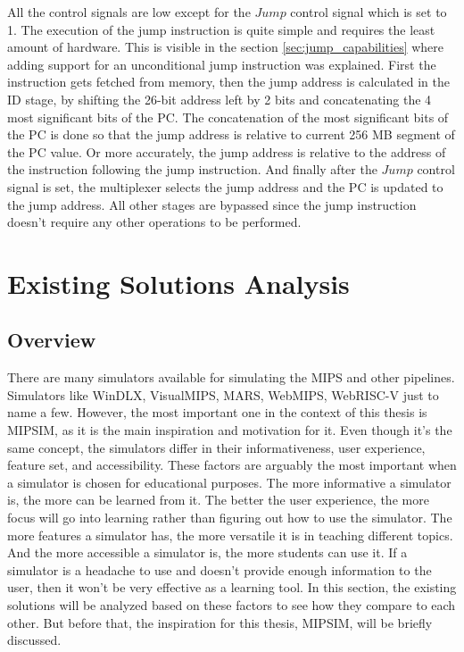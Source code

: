 All the control signals are low except for the $Jump$ control signal which is set to 1. The execution of the jump instruction is quite simple and requires the least amount of hardware. This is visible in the section \ref{sec:jump_capabilities} where adding support for an unconditional jump instruction was explained. First the instruction gets fetched from memory, then the jump address is calculated in the ID stage, by shifting the 26-bit address left by 2 bits and concatenating the 4 most significant bits of the PC. The concatenation of the most significant bits of the PC is done so that the jump address is relative to current 256 MB segment of the PC value. Or more accurately, the jump address is relative to the address of the instruction following the jump instruction. And finally after the $Jump$ control signal is set, the multiplexer selects the jump address and the PC is updated to the jump address. All other stages are bypassed since the jump instruction doesn't require any other operations to be performed.




\section {Existing Solutions Analysis}

\subsection {Overview}\label{sec:existing_solutions_overview}
There are many simulators available for simulating the MIPS and other pipelines. Simulators like WinDLX\cite{grunbacher1996windlx}, VisualMIPS\cite{visualmips}, MARS\cite{mars}, WebMIPS, WebRISC-V\cite{Mariotti22-softwarex} just to name a few. However, the most important one in the context of this thesis is MIPSIM\cite{grunbacher1996windlx}, as it is the main inspiration and motivation for it. Even though it's the same concept, the simulators differ in their informativeness, user experience, feature set, and accessibility. These factors are arguably the most important when a simulator is chosen for educational purposes. The more informative a simulator is, the more can be learned from it. The better the user experience, the more focus will go into learning rather than figuring out how to use the simulator. The more features a simulator has, the more versatile it is in teaching different topics. And the more accessible a simulator is, the more students can use it.
If a simulator is a headache to use and doesn't provide enough information to the user, then it won't be very effective as a learning tool. In this section, the existing solutions will be analyzed based on these factors to see how they compare to each other.
But before that, the inspiration for this thesis, MIPSIM, will be briefly discussed.


